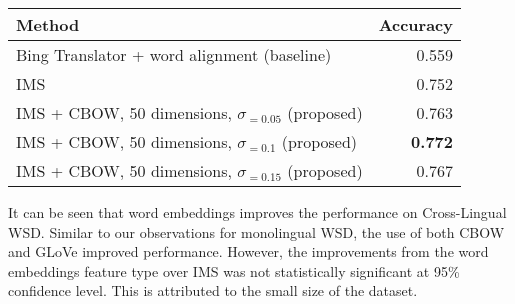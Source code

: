 {\begin{table}[ht]
\begin{center}
			\begin{tabular}{| p{9cm}| r| }
				\hline
				\textbf{Method} & \textbf{Accuracy} \\
				\hline
				Bing Translator + 
                word alignment (baseline) & 0.559  \\
				\hline
				IMS & 0.752  \\
				\hline
                IMS + CBOW, 50 dimensions, $\sigma _{=0.05}$ (proposed) &  0.763  \\
				\hline
				IMS + CBOW, 50 dimensions, $\sigma _{=0.1}$ (proposed) & {\bf 0.772}  \\                                
                \hline
                IMS + CBOW, 50 dimensions, $\sigma _{=0.15}$ (proposed) & 0.767  \\
                \hline


			\end{tabular}

	\end{center}
\end{table}



It can be seen that word embeddings improves the performance on Cross-Lingual WSD. Similar to our observations for monolingual WSD, the use of both CBOW and GLoVe improved performance. However, the improvements from the word embeddings feature type over IMS was not statistically significant at 95\% confidence level. This is attributed to the small size of the dataset. 

}
